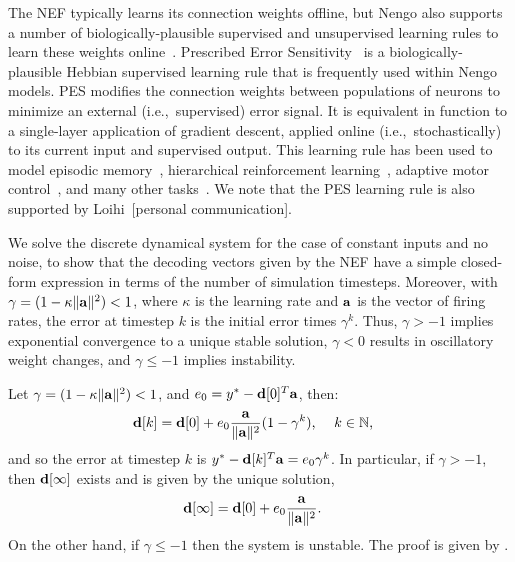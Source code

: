 The NEF typically learns its connection weights offline, but Nengo also supports a number of biologically-plausible supervised and unsupervised learning rules to learn these weights online~\citep{bekolay2011a}.
Prescribed Error Sensitivity~\citep[PES;][]{bekolay2013} is a biologically-plausible Hebbian supervised learning rule that is frequently used within Nengo models.
PES modifies the connection weights between populations of neurons to minimize an external (i.e.,~supervised) error signal.
It is equivalent in function to a single-layer application of gradient descent, applied online (i.e.,~stochastically) to its current input and supervised output.
This learning rule has been used to model episodic memory~\citep{trujillo2014}, hierarchical reinforcement learning~\citep{rasmussen2017}, adaptive motor control~\citep{komer2015, dewolf2016}, and many other tasks~\citep{aubin2018, choo2018}.
We note that the PES learning rule is also supported by Loihi~[personal communication].

We solve the discrete dynamical system for the case of constant inputs and no noise, to show that the decoding vectors given by the NEF have a simple closed-form expression in terms of the number of simulation timesteps. Moreover, with $\gamma = (1 - \kappa \|\mathbf{a}\|^2) < 1$, where $\kappa$ is the learning rate and $\mathbf{a}$ is the vector of firing rates, the error at timestep $k$ is the initial error times $\gamma^k$. Thus, $\gamma > - 1$ implies exponential convergence to a unique stable solution, $\gamma < 0 $ results in oscillatory weight changes, and $\gamma \le -1$ implies instability.
\begin{theorem}
\label{thm:pes-dynamics}
{\normalfont \citep{voelker2015}}
\newline
Let $\gamma = (1 - \kappa \|\mathbf{a}\|^2) < 1$, and $e_0 = y^* - \mathbf{d}[0]^T \mathbf{a}$, then:
\begin{align}
\label{eq:dk}
\mathbf{d}[k] &= \mathbf{d}[0] + e_0\frac{\mathbf{a}}{\|\mathbf{a}\|^2} (1 - \gamma^k)\text{, \quad $k \in \mathbb{N}$} \text{,}
\end{align}
and so the error at timestep $k$ is $y^* - \mathbf{d}[k]^T \mathbf{a} = e_0\gamma^k$. In particular, if $\gamma > - 1$, then $\mathbf{d}[\infty]$ exists and is given by the unique solution,
\begin{align}
\label{eq:dinf}
\mathbf{d}[\infty] &= \mathbf{d}[0] + e_0\frac{\mathbf{a}}{\|\mathbf{a}\|^2} .
\end{align}
On the other hand, if $\gamma \le -1$ then the system is unstable.
The proof is given by \citet{voelker2015}.
\end{theorem}

